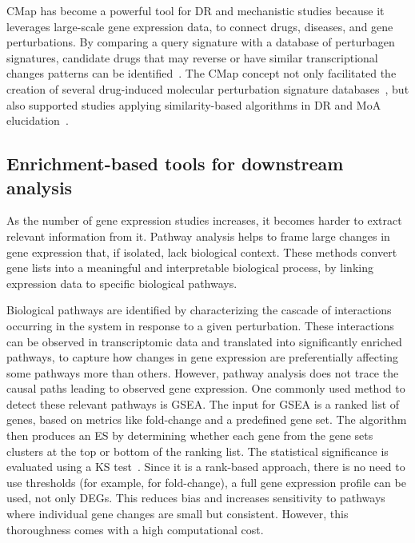 \gls{CMap} has become a powerful tool for \gls{DR} and mechanistic studies because it leverages large-scale gene expression data, to connect drugs, diseases, and gene perturbations. 
By comparing a query signature with a database of perturbagen signatures, candidate drugs that may reverse or have similar transcriptional changes patterns can be identified~\cite{RN102}. The \gls{CMap} concept not only facilitated the creation of several drug-induced molecular perturbation signature databases~\cite{RN84}, but also supported studies applying similarity-based algorithms in \gls{DR} and \gls{MoA} elucidation~\cite{RN86}. 

\subsection{Enrichment-based tools for downstream analysis} %
\label{sub:enrichmentbasedtools}

As the number of gene expression studies increases, it becomes harder to extract relevant information from it. Pathway analysis helps to frame large changes in gene expression that, if isolated, lack biological context. These methods convert gene lists into a meaningful and interpretable biological process, by linking expression data to specific biological pathways.

Biological pathways are identified by characterizing the cascade of interactions occurring in the system in response to a given perturbation. These interactions can be observed in transcriptomic data and translated into significantly enriched pathways, to capture how changes in gene expression are preferentially affecting some pathways more than others. However, pathway analysis does not trace the causal paths leading to observed gene expression. One commonly used method to detect these relevant pathways is \gls{GSEA}. The input for \gls{GSEA} is a ranked list of genes, based on metrics like fold-change and a predefined gene set.
The algorithm then produces an \gls{ES} by determining whether each gene from the gene sets clusters at the top or bottom of the ranking list.
The statistical significance is evaluated using a \gls{KS} test~\cite{RN152}. 
Since it is a rank-based approach, there is no need to use thresholds (for example, for fold-change), a full gene expression profile can be used, not only \gls{DEGs}. This reduces bias and increases sensitivity to pathways where individual gene changes are small but consistent. However, this thoroughness comes with a high computational cost.

